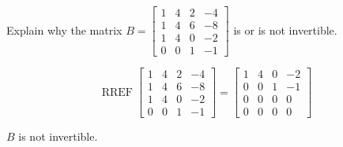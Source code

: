 
\begin{exerciseStatement}


Explain why the matrix \(B= \left[\begin{array}{cccc}
1 & 4 & 2 & -4 \\
1 & 4 & 6 & -8 \\
1 & 4 & 0 & -2 \\
0 & 0 & 1 & -1
\end{array}\right] \) is or is not invertible.


\end{exerciseStatement}
    
\begin{exerciseAnswer} 


\[\operatorname{RREF} \left[\begin{array}{cccc}
1 & 4 & 2 & -4 \\
1 & 4 & 6 & -8 \\
1 & 4 & 0 & -2 \\
0 & 0 & 1 & -1
\end{array}\right] = \left[\begin{array}{cccc}
1 & 4 & 0 & -2 \\
0 & 0 & 1 & -1 \\
0 & 0 & 0 & 0 \\
0 & 0 & 0 & 0
\end{array}\right] \]

\(B\) is not invertible.
\end{exerciseAnswer}
    
